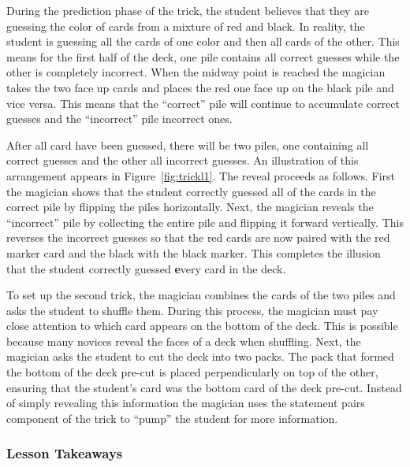 During the prediction phase of the trick, the student believes that they are
guessing the color of cards from a mixture of red and black.
In reality,
the student is guessing all the cards of one color and then all cards of
the other.
This means for the first half of the deck, one pile contains all correct
guesses while the other is completely incorrect.
When the midway point is reached the magician takes the two face up cards and places the
red one face up on the black pile and vice versa.
This means that the ``correct'' pile will continue to accumulate correct
guesses and the ``incorrect'' pile incorrect ones.

After all card have been guessed, there will be two piles,
one containing all correct guesses and the other
all incorrect guesses.
An illustration of this arrangement appears in Figure~\ref{fig:trickl1}.
The reveal proceeds as follows.
First the magician shows that the student correctly guessed all of the cards
in the correct pile by flipping the piles horizontally.
Next, the magician reveals the ``incorrect'' pile by collecting the
entire pile and flipping it forward vertically.  This
reverses the incorrect guesses so that the red cards are now paired
with the red marker card and the black with the black marker.  This completes
the illusion that the student correctly guessed {\textbf every} card in the
deck.

To set up the second trick, the magician combines the cards of the two piles and asks the
student to shuffle them.  During this process, the magician must pay close
attention to which card appears on the bottom of the deck.  This is possible
because many novices reveal the faces of a deck when shuffling.  Next,
the magician asks the student to cut the deck into two packs.  The pack that
formed the bottom of the deck pre-cut is placed perpendicularly on
top of the other, ensuring that the student's card was the bottom card of
the deck pre-cut. Instead of simply revealing this information the
magician uses the statement pairs component of the trick to ``pump'' the student
for more information.

%

\subsubsection{Lesson Takeaways}

